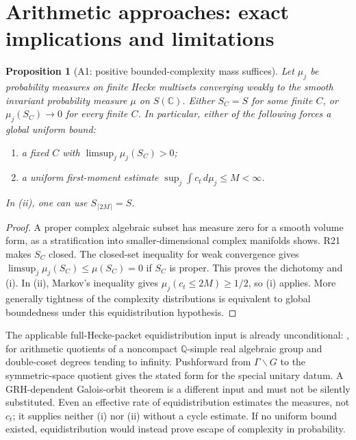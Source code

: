 \documentclass[11pt,a4paper]{article}
\newtheorem{proposition}[theorem]{Proposition}
\theoremstyle{definition}\newtheorem{definition}[theorem]{Definition}
\theoremstyle{remark}\newtheorem{remark}[theorem]{Remark}
\newcommand{\Q}{\mathbb Q}\newcommand{\Z}{\mathbb Z}\newcommand{\C}{\mathbb C}\newcommand{\R}{\mathbb R}
\begin{document}
\section{Arithmetic approaches: exact implications and limitations}\label{sec:arithmetic}
\begin{proposition}[A1: positive bounded-complexity mass suffices]\label{A1}
Let $\mu_j$ be probability measures on finite Hecke multisets converging weakly to the smooth invariant probability measure $\mu$ on $S(\C)$. Either $S_C=S$ for some finite $C$, or $\mu_j(S_C)\to0$ for every finite $C$. In particular, either of the following forces a global uniform bound:
\begin{enumerate}[label=(\roman*)]
\item a fixed $C$ with $\limsup_j\mu_j(S_C)>0$;
\item a uniform first-moment estimate $\sup_j\int c_t\,d\mu_j\le M<\infty$.
\end{enumerate}
In (ii), one can use $S_{\lceil2M\rceil}=S$.
\end{proposition}
\begin{proof}
A proper complex algebraic subset has measure zero for a smooth volume form, as a stratification into smaller-dimensional complex manifolds shows. R21 makes $S_C$ closed. The closed-set inequality for weak convergence gives
$\limsup_j\mu_j(S_C)\le\mu(S_C)=0$ if $S_C$ is proper. This proves the dichotomy and (i). In (ii), Markov's inequality gives $\mu_j(c_t\le2M)\ge1/2$, so (i) applies. More generally tightness of the complexity distributions is equivalent to global boundedness under this equidistribution hypothesis.
\end{proof}

The applicable full-Hecke-packet equidistribution input is already unconditional: \citet[Theorem~1.2]{EskinOh06}, for arithmetic quotients of a noncompact $\Q$-simple real algebraic group and double-coset degrees tending to infinity. Pushforward from $\Gamma\backslash G$ to the symmetric-space quotient gives the stated form for the special unitary datum. A GRH-dependent Galois-orbit theorem is a different input and must not be silently substituted. Even an effective rate of equidistribution estimates the measures, not $c_t$; it supplies neither (i) nor (ii) without a cycle estimate. If no uniform bound existed, equidistribution would instead prove escape of complexity in probability.
\end{document}
